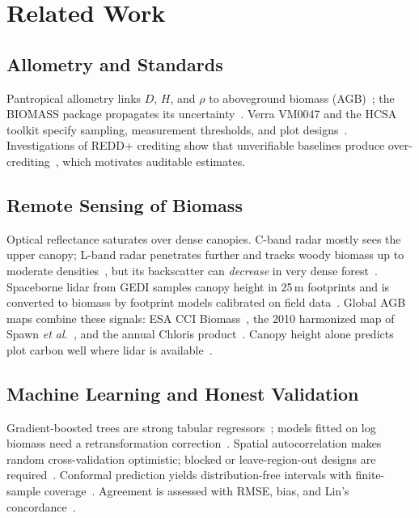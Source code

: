 \documentclass[conference,a4paper]{IEEEtran}
\begin{document}
\section{Related Work}

\subsection{Allometry and Standards}
Pantropical allometry links $D$, $H$, and $\rho$ to aboveground biomass (AGB)~\cite{chave2014improved}; the BIOMASS package propagates its uncertainty~\cite{rejou2017biomass}. Verra VM0047 and the HCSA toolkit specify sampling, measurement thresholds, and plot designs~\cite{verra2025vm0047,rosoman2017hcsa}. Investigations of REDD+ crediting show that unverifiable baselines produce over-crediting~\cite{west2023redd}, which motivates auditable estimates.

\subsection{Remote Sensing of Biomass}
Optical reflectance saturates over dense canopies. C-band radar mostly sees the upper canopy; L-band radar penetrates further and tracks woody biomass up to moderate densities~\cite{mitchard2009using}, but its backscatter can \emph{decrease} in very dense forest~\cite{mermoz2015decrease}. Spaceborne lidar from GEDI samples canopy height in 25\,m footprints and is converted to biomass by footprint models calibrated on field data~\cite{dubayah2020gedi,duncanson2022gedi}. Global AGB maps combine these signals: ESA CCI Biomass~\cite{santoro2021global}, the 2010 harmonized map of Spawn \textit{et al.}~\cite{spawn2020harmonized}, and the annual Chloris product~\cite{chloris2022}. Canopy height alone predicts plot carbon well where lidar is available~\cite{asner2014mapping}.

\subsection{Machine Learning and Honest Validation}
Gradient-boosted trees are strong tabular regressors~\cite{ke2017lightgbm}; models fitted on log biomass need a retransformation correction~\cite{duan1983smearing}. Spatial autocorrelation makes random cross-validation optimistic; blocked or leave-region-out designs are required~\cite{roberts2017cv,ploton2020spatial}. Conformal prediction yields distribution-free intervals with finite-sample coverage~\cite{vovk2005algorithmic}. Agreement is assessed with RMSE, bias, and Lin's concordance~\cite{lin1989concordance}.
\end{document}
